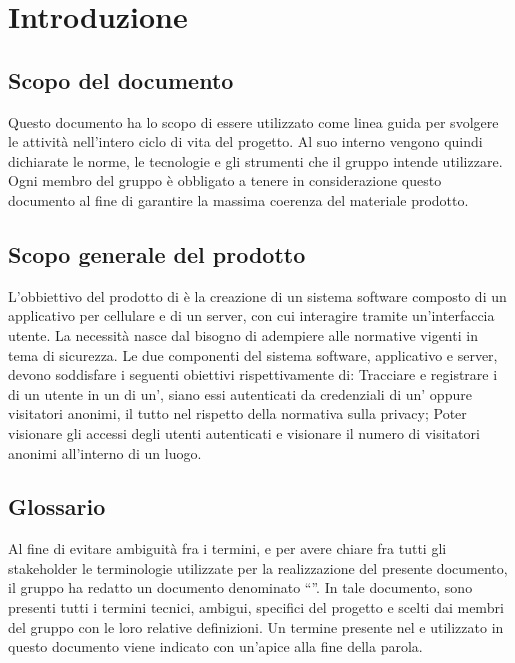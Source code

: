 \section{Introduzione}
\subsection{Scopo del documento}
Questo documento ha lo scopo di essere utilizzato come linea guida per svolgere le attività nell'intero ciclo di vita del progetto.
Al suo interno vengono quindi dichiarate le norme, le tecnologie e gli strumenti che il gruppo \Gruppo{} intende utilizzare.
Ogni membro del gruppo è obbligato a tenere in considerazione questo documento al fine di garantire la massima coerenza del materiale prodotto.
	
\subsection{Scopo generale del prodotto}
L'obbiettivo del prodotto \NomeProgetto{} di \Proponente{} è la creazione di un sistema software composto di un applicativo per cellulare e di un server, con cui interagire tramite un'interfaccia utente. La necessità nasce dal bisogno di adempiere alle normative vigenti in tema di sicurezza.
Le due componenti del sistema software, applicativo e server, devono soddisfare i seguenti obiettivi rispettivamente di:
Tracciare e registrare i  di un utente in un  di un', siano essi autenticati da credenziali di un' oppure visitatori anonimi, il tutto nel rispetto della normativa sulla privacy;
Poter visionare gli accessi degli utenti autenticati e visionare il numero di visitatori anonimi all'interno di un luogo.

\subsection{Glossario}
Al fine di evitare ambiguità fra i termini, e per avere chiare fra tutti gli stakeholder le terminologie utilizzate per la realizzazione del presente documento, il gruppo \Gruppo{} ha redatto un documento denominato “”.
In tale documento, sono presenti tutti i termini tecnici, ambigui, specifici del progetto e scelti dai membri del gruppo con le loro relative definizioni.
Un termine presente nel  e utilizzato in questo documento viene indicato con un'apice  alla fine della parola.
	
